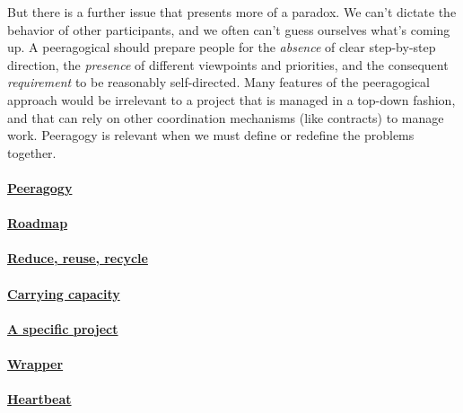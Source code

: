 \begin{refsection}
But there is a further issue that presents more of a paradox.  We
can't dictate the behavior of other participants, and we often can't
guess ourselves what's coming up.  A peeragogical
 should prepare people for the \emph{absence} of
clear step-by-step direction, the \emph{presence} of different
viewpoints and priorities, and the consequent \emph{requirement} to be
reasonably self-directed.  Many features of the peeragogical approach
would be irrelevant to a project that is managed in a top-down
fashion, and that can rely on other coordination mechanisms (like
contracts) to manage work.  Peeragogy is relevant when we must define
or redefine the problems together.


\paragraph{\hyperref[sec:Peeragogy]{Peeragogy}} 
\PeeragogyWN

\paragraph{\hyperref[sec:Roadmap]{Roadmap}} 
\RoadmapWN

\paragraph{\hyperref[sec:Reduce, reuse, recycle]{Reduce, reuse, recycle}}
\ReduceWN

\paragraph{\hyperref[sec:Carrying capacity]{Carrying capacity}} 
\CarryingWN

\paragraph{\hyperref[sec:A specific project]{A specific project}}
\SpecificWN

\paragraph{\hyperref[sec:Wrapper]{Wrapper}}
\WrapperWN

\paragraph{\hyperref[sec:Heartbeat]{Heartbeat}}
\HeartbeatWN


\end{refsection}
